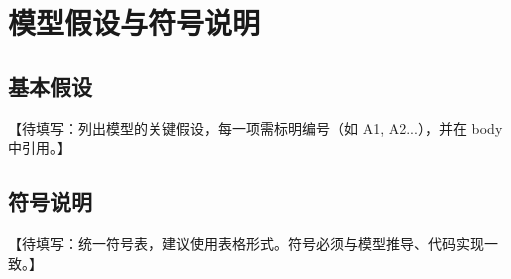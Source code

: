 \section{模型假设与符号说明}\label{sec:hypothesis}

\subsection{基本假设}\label{subsec:assumptions}

【待填写：列出模型的关键假设，每一项需标明编号（如 A1, A2...），并在 body 中引用。】


\subsection{符号说明}\label{subsec:notation}

【待填写：统一符号表，建议使用表格形式。符号必须与模型推导、代码实现一致。】


